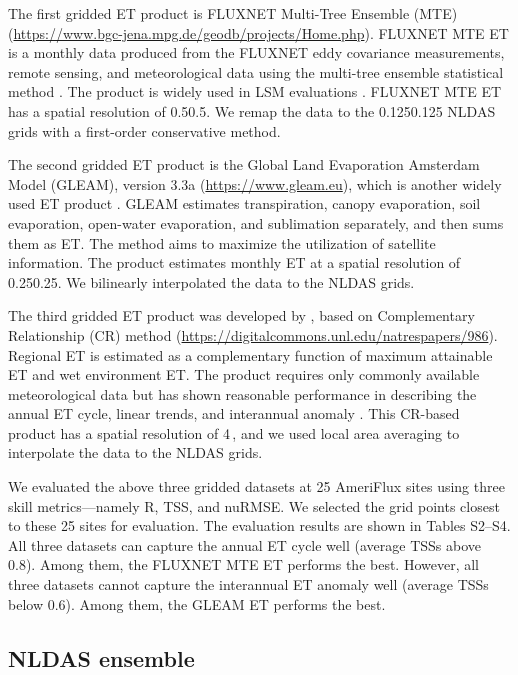 \documentclass[essd, manuscript]{copernicus}
\let\unit\undefined
\begin{document}
The first gridded ET product is FLUXNET Multi-Tree Ensemble (MTE) \citep{jung2009B} (\url{https://www.bgc-jena.mpg.de/geodb/projects/Home.php}). FLUXNET MTE ET is a monthly data produced from the FLUXNET eddy covariance measurements, remote sensing, and meteorological data using the multi-tree ensemble statistical method \citep{jung2009B}. The product is widely used in LSM evaluations \citep{cai2014JGRA, ma2017JGRA, xia2016JGRA, jung2019SD, fang2020AFM, zhang2020AFM, pan2020HESS}. FLUXNET MTE ET has a spatial resolution of 0.5\degree{}\times{}0.5\degree{}. We remap the data to the 0.125\degree{}\times{}0.125\degree{} NLDAS grids with a first-order conservative method.

The second gridded ET product is the Global Land Evaporation Amsterdam Model (GLEAM), version 3.3a (\url{https://www.gleam.eu}), which is another widely used ET product \citep{xu2019JHa}. GLEAM estimates transpiration, canopy evaporation, soil evaporation, open-water evaporation, and sublimation separately, and then sums them as ET. The method aims to maximize the utilization of satellite information. The product estimates monthly ET at a spatial resolution of 0.25\degree{}\times{}0.25\degree{}. We bilinearly interpolated the data to the NLDAS grids.

The third gridded ET product was developed by \citet{ma2019WRR}, based on Complementary Relationship (CR) method (\url{https://digitalcommons.unl.edu/natrespapers/986}). Regional ET is estimated as a complementary function \citep{szilagyi2017JGRA} of maximum attainable ET and wet environment ET. The product requires only commonly available meteorological data but has shown reasonable performance in describing the annual ET cycle, linear trends, and interannual anomaly \citep{ma2019JGRA, ma2019WRR}. This CR-based product has a spatial resolution of 4\,\unit{km}, and we used local area averaging to interpolate the data to the NLDAS grids.

We evaluated the above three gridded datasets at 25 AmeriFlux sites using three skill metrics---namely R, TSS, and nuRMSE. We selected the grid points closest to these 25 sites for evaluation. The evaluation results are shown in Tables S2--S4. All three datasets can capture the annual ET cycle well (average TSSs above 0.8). Among them, the FLUXNET MTE ET performs the best. However, all three datasets cannot capture the interannual ET anomaly well (average TSSs below 0.6). Among them, the GLEAM ET performs the best.

\subsection{NLDAS ensemble}\label{sec:methods:nldas}
\end{document}
